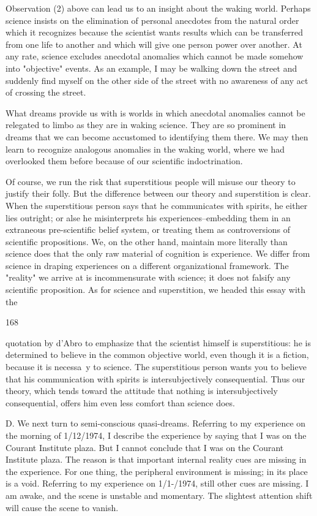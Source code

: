 \documentclass[10pt,twoside]{memoir}
\begin{document}
\begin{enumerate}
{{Observation (2) above can lead us to an insight about the waking world. 
Perhaps science insists on the elimination of personal anecdotes from the 
natural order which it recognizes because the scientist wants results which 
can be transferred from one life to another and which will give one person 
power over another. At any rate, science excludes anecdotal anomalies which 
cannot be made somehow into "objective" events. As an example, I may be 
walking down the street and suddenly find myself on the other side of the 
street with no awareness of any act of crossing the street. 

What dreams provide us with is worlds in which anecdotal anomalies 
cannot be relegated to limbo as they are in waking science. They are so 
prominent in dreams that we can become accustomed to identifying them 
there. We may then learn to recognize analogous anomalies in the waking 
world, where we had overlooked them before because of our scientific 
indoctrination. 

Of course, we run the risk that superstitious people will misuse our 
theory to justify their folly. But the difference between our theory and 
superstition is clear. When the superstitious person says that he 
communicates with spirits, he either lies outright; or alse he misinterprets his 
experiences--embedding them in an extraneous pre-scientific belief system, 
or treating them as controversions of scientific propositions. We, on the 
other hand, maintain more literally than science does that the only raw 
material of cognition is experience. We differ from science in draping 
experiences on a different organizational framework. The "reality" we arrive 
at is incommensurate with science; it does not falsify any scientific 
proposition. As for science and superstition, we headed this essay with the 


168 


quotation by d'Abro to emphasize that the scientist himself is superstitious: 
he is determined to believe in the common objective world, even though it is 
a fiction, because it is necessa~y to science. The superstitious person wants 
you to believe that his communication with spirits is intersubjectively 
consequential. Thus our theory, which tends toward the attitude that 
nothing is intersubjectively consequential, offers him even less comfort than 
science does. 

D. We next turn to semi-conscious quasi-dreams. Referring to my 
experience on the morning of 1/12/1974, I describe the experience by saying 
that I was on the Courant Institute plaza. But I cannot conclude that I was 
on the Courant Institute plaza. The reason is that important internal reality 
cues are missing in the experience. For one thing, the peripheral environment 
is missing; in its place is a void. Referring to my experience on 1/1-/1974, 
still other cues are missing. I am awake, and the scene is unstable and 
momentary. The slightest attention shift will cause the scene to vanish. 

}}
\end{enumerate}
\end{document}
